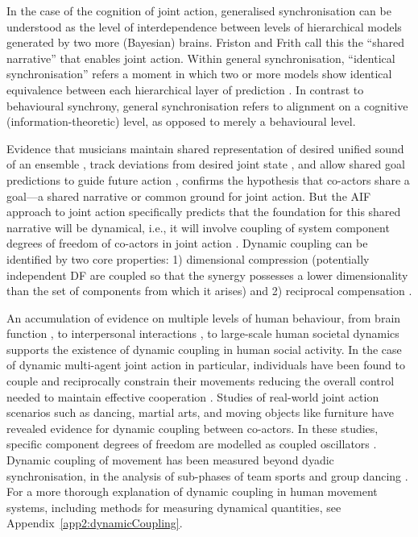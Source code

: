\begin{CJK}{UTF8}{gbsn}
In the case of the cognition of joint action, generalised synchronisation can be understood as the level of interdependence between levels of hierarchical models generated by two more (Bayesian) brains.  Friston and Frith call this the ``shared narrative'' that enables joint action.  Within general synchronisation, ``identical synchronisation'' refers a moment in which two or more models show identical equivalence between each hierarchical layer of prediction \citep{Friston2015}.   In contrast to behavioural synchrony, general synchronisation refers to alignment on a cognitive (information-theoretic) level, as opposed to merely a behavioural level.

Evidence that musicians maintain shared representation of desired unified sound of an ensemble \citep{Keller2008}, track deviations from desired joint state \citep{Loehr2013}, and allow shared goal predictions to guide future action \citep{Loehr2016}, confirms the hypothesis that co-actors share a goal---a shared narrative or common ground for joint action.  But the AIF approach to joint action specifically predicts that the foundation for this shared narrative will be dynamical, i.e., it will involve coupling of system component degrees of freedom of co-actors in joint action \citep{Turvey1978,Schmidt1990}. Dynamic coupling can be identified by two core properties:  1) dimensional compression (potentially independent DF are coupled so that the synergy possesses a lower dimensionality than the set of components from which it arises) and 2) reciprocal compensation \citep[the ability of one component of a synergy to react to changes in others][]{Riley2011}.

An accumulation of evidence on multiple levels of human behaviour, from brain function \citep{Yufik1998,Sengupta2013}, to interpersonal interactions \citep{Kelso2009,Riley2011,Fusaroli2014}, to large-scale human societal dynamics \citep{Nowak2017} supports the existence of dynamic coupling in human social activity.  In the case of dynamic multi-agent joint action in particular, individuals have been found to couple and reciprocally constrain their movements reducing the overall control needed to maintain effective cooperation \citep{Ramenzoni2011,Ramenzoni2012,Riley2011,Schmidt1990}.  Studies of real-world joint action scenarios such as dancing, martial arts, and moving objects like furniture have revealed evidence for dynamic coupling between co-actors.  In these studies, specific component degrees of freedom are modelled as coupled oscillators \citep[using the HKB model, which describes the change in the relative phase between two oscillatory components. See][]{Haken1985,Kelso1986}.  Dynamic coupling of movement has been measured beyond dyadic synchronisation, in the analysis of sub-phases of team sports  \citep{Passos2014,Duarte2012} and group dancing \citep{Chauvigne2017}.  For a more thorough explanation of dynamic coupling in human movement systems, including methods for measuring dynamical quantities, see Appendix~\ref{app2:dynamicCoupling}.


\end{CJK}
